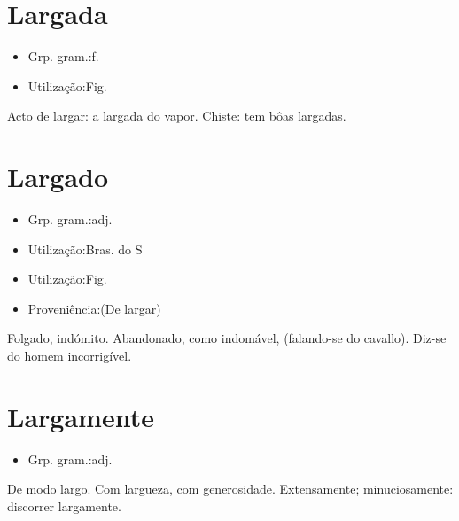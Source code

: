 \section{Largada}
\begin{itemize}
\item {Grp. gram.:f.}
\end{itemize}
\begin{itemize}
\item {Utilização:Fig.}
\end{itemize}
Acto de \textunderscore largar\textunderscore : \textunderscore a largada do vapor\textunderscore .
Chiste: \textunderscore tem bôas largadas\textunderscore .
\section{Largado}
\begin{itemize}
\item {Grp. gram.:adj.}
\end{itemize}
\begin{itemize}
\item {Utilização:Bras. do S}
\end{itemize}
\begin{itemize}
\item {Utilização:Fig.}
\end{itemize}
\begin{itemize}
\item {Proveniência:(De \textunderscore largar\textunderscore )}
\end{itemize}
Folgado, indómito.
Abandonado, como indomável, (falando-se do cavallo).
Diz-se do homem incorrigível.
\section{Largamente}
\begin{itemize}
\item {Grp. gram.:adj.}
\end{itemize}
De modo largo.
Com largueza, com generosidade.
Extensamente; minuciosamente: \textunderscore discorrer largamente\textunderscore .
